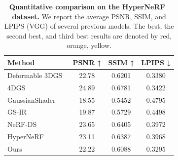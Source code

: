 \begin{table}[t]
\centering
\small
\caption{\textbf{Quantitative comparison on the HyperNeRF~\citep{park2021hypernerf} dataset.} We report the average PSNR, SSIM, and LPIPS (VGG) of several previous models. The \colorbox{red!25}{best}, the \colorbox{orange!25}{second best}, and \colorbox{yellow!25}{third best} results are denoted by red, orange, yellow.}
\label{tab:hyper_main}
\vspace{-2mm}
\begin{tabular}{lccc}
\toprule
Method & PSNR ↑ & SSIM ↑ & LPIPS ↓ \\
\midrule
Deformable 3DGS~\citep{yang2023deformable} &{22.78} &{0.6201} &\colorbox{orange!25}{0.3380} \\
4DGS~\citep{wu20234d} &\colorbox{red!25}{24.89} &\colorbox{red!25}{0.6781} &\colorbox{yellow!25}{0.3422}  \\
GaussianShader~\citep{jiang2023gaussianshader} &18.55 &0.5452 &0.4795  \\
GS-IR~\citep{liang2023gs} &19.87 &0.5729 &0.4498 \\
NeRF-DS~\citep{yan2023nerf} &\colorbox{orange!25}{23.65} &\colorbox{orange!25}{0.6405} &0.3972\\
HyperNeRF~\citep{park2021hypernerf}
&\colorbox{yellow!25}{23.11} &\colorbox{yellow!25}{0.6387} &{0.3968}\\
Ours &22.22 &0.6088 &\colorbox{red!25}{0.3295}\\
\bottomrule
\end{tabular}
\end{table}